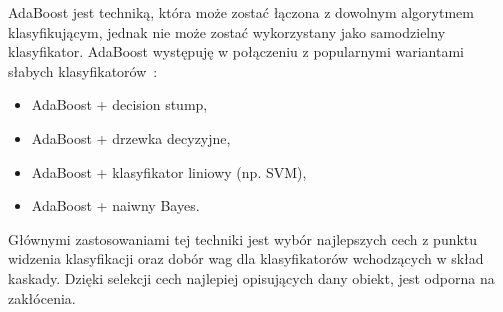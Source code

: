 AdaBoost jest techniką, która może zostać łączona z dowolnym algorytmem klasyfikującym, jednak nie może zostać wykorzystany jako samodzielny klasyfikator.
AdaBoost występuję w połączeniu z popularnymi wariantami słabych klasyfikatorów~\cite{szybka_detekcja_klesk}:
\begin{itemize}
    \item AdaBoost + decision stump,
    \item AdaBoost + drzewka decyzyjne,
    \item AdaBoost + klasyfikator liniowy (np. SVM),
    \item AdaBoost + naiwny Bayes.
\end{itemize}
Głównymi zastosowaniami tej techniki jest wybór najlepszych cech z punktu widzenia klasyfikacji oraz dobór wag dla klasyfikatorów wchodzących w skład kaskady.
Dzięki selekcji cech najlepiej opisujących dany obiekt, jest odporna na zakłócenia.

